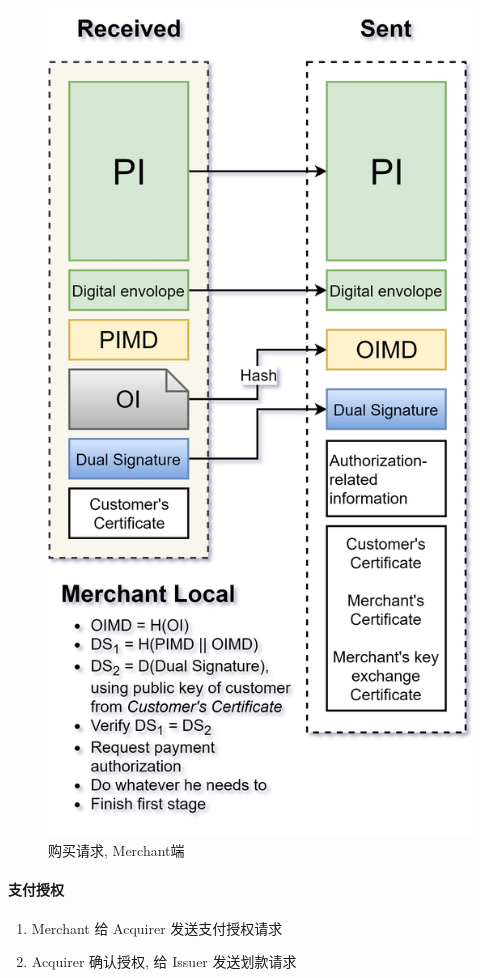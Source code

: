 \documentclass{ctexart}
\begin{document}
    \begin{figure}[ht!]
    \centering
    \includegraphics[height=\textheight, width=\textwidth, keepaspectratio]{set-2.jpg}
    \caption{购买请求, Merchant端}
    \label{set-2}
    \end{figure}
\clearpage
\paragraph{支付授权}
    \begin{enumerate}
        \item Merchant 给 Acquirer 发送支付授权请求
        \item Acquirer 确认授权, 给 Issuer 发送划款请求
    \end{enumerate}
\end{document}
